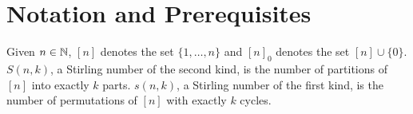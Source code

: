 \section{Notation and Prerequisites}
	
	Given $n \in \mathbb{N}$, $[n]$ denotes the set $\{1,\ldots,n\}$ and $[n]_0$ denotes the set $[n] \cup \{0\}$.\\
	$S(n,k)$, a Stirling number of the second kind, is the number of partitions of $[n]$ into exactly $k$ parts. $s(n,k)$, a Stirling number of the first kind, is the number of permutations of $[n]$ with exactly $k$ cycles.\\
	

\clearpage